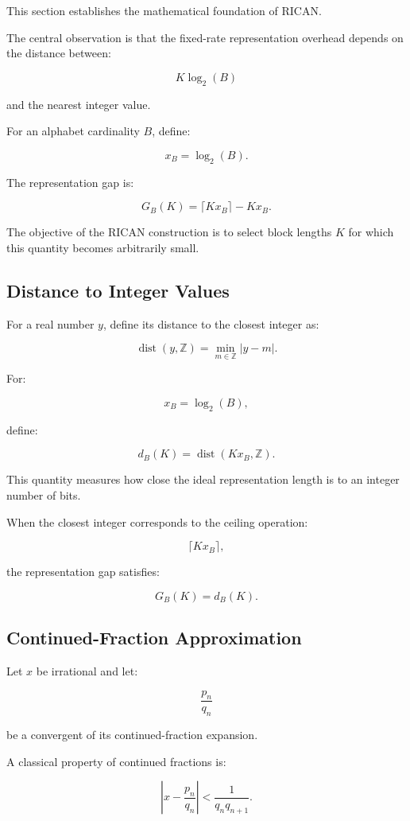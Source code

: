 \documentclass[onecolumn]{IEEEtran}
\begin{document}
This section establishes the mathematical foundation of RICAN.

The central observation is that the fixed-rate representation overhead
depends on the distance between:

\[
K\log_2(B)
\]

and the nearest integer value.

For an alphabet cardinality $B$, define:

\[
x_B=\log_2(B).
\]

The representation gap is:

\[
G_B(K)
=
\lceil Kx_B\rceil-Kx_B .
\]

The objective of the RICAN construction is to select block lengths
$K$ for which this quantity becomes arbitrarily small.

\subsection{Distance to Integer Values}

For a real number $y$, define its distance to the closest integer as:

\[
\operatorname{dist}(y,\mathbb{Z})
=
\min_{m\in\mathbb{Z}}|y-m|.
\]

For:

\[
x_B=\log_2(B),
\]

define:

\[
d_B(K)
=
\operatorname{dist}(Kx_B,\mathbb{Z}).
\]

This quantity measures how close the ideal representation length is to
an integer number of bits.

When the closest integer corresponds to the ceiling operation:

\[
\lceil Kx_B\rceil,
\]

the representation gap satisfies:

\[
G_B(K)=d_B(K).
\]

\subsection{Continued-Fraction Approximation}

Let $x$ be irrational and let:

\[
\frac{p_n}{q_n}
\]

be a convergent of its continued-fraction expansion.

A classical property of continued fractions is:

\[
\left|
x-\frac{p_n}{q_n}
\right|
<
\frac{1}{q_nq_{n+1}} .
\]
\end{document}
